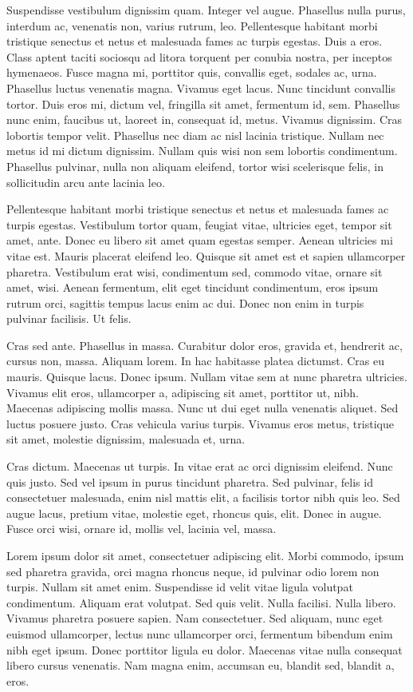 Suspendisse vestibulum dignissim quam. Integer vel augue. Phasellus nulla
purus, interdum ac, venenatis non, varius rutrum, leo. Pellentesque habitant
morbi tristique senectus et netus et malesuada fames ac turpis egestas. Duis a
eros. Class aptent taciti sociosqu ad litora torquent per conubia nostra, per
inceptos hymenaeos. Fusce magna mi, porttitor quis, convallis eget, sodales ac,
urna. Phasellus luctus venenatis magna. Vivamus eget lacus. Nunc tincidunt
convallis tortor. Duis eros mi, dictum vel, fringilla sit amet, fermentum id,
sem. Phasellus nunc enim, faucibus ut, laoreet in, consequat id, metus. Vivamus
dignissim. Cras lobortis tempor velit. Phasellus nec diam ac nisl lacinia
tristique. Nullam nec metus id mi dictum dignissim. Nullam quis wisi non sem
lobortis condimentum. Phasellus pulvinar, nulla non aliquam eleifend, tortor
wisi scelerisque felis, in sollicitudin arcu ante lacinia leo.

Pellentesque habitant morbi tristique senectus et netus et malesuada fames ac
turpis egestas. Vestibulum tortor quam, feugiat vitae, ultricies eget, tempor
sit amet, ante. Donec eu libero sit amet quam egestas semper. Aenean ultricies
mi vitae est. Mauris placerat eleifend leo. Quisque sit amet est et sapien
ullamcorper pharetra. Vestibulum erat wisi, condimentum sed, commodo vitae,
ornare sit amet, wisi. Aenean fermentum, elit eget tincidunt condimentum, eros
ipsum rutrum orci, sagittis tempus lacus enim ac dui. Donec non enim in turpis
pulvinar facilisis. Ut felis.

Cras sed ante. Phasellus in massa. Curabitur dolor eros, gravida et, hendrerit
ac, cursus non, massa. Aliquam lorem. In hac habitasse platea dictumst. Cras eu
mauris. Quisque lacus. Donec ipsum. Nullam vitae sem at nunc pharetra
ultricies. Vivamus elit eros, ullamcorper a, adipiscing sit amet, porttitor ut,
nibh. Maecenas adipiscing mollis massa. Nunc ut dui eget nulla venenatis
aliquet. Sed luctus posuere justo. Cras vehicula varius turpis. Vivamus eros
metus, tristique sit amet, molestie dignissim, malesuada et, urna.

Cras dictum. Maecenas ut turpis. In vitae erat ac orci dignissim eleifend. Nunc
quis justo. Sed vel ipsum in purus tincidunt pharetra. Sed pulvinar, felis id
consectetuer malesuada, enim nisl mattis elit, a facilisis tortor nibh quis
leo. Sed augue lacus, pretium vitae, molestie eget, rhoncus quis, elit. Donec
in augue. Fusce orci wisi, ornare id, mollis vel, lacinia vel, massa.

Lorem ipsum dolor sit amet, consectetuer adipiscing elit. Morbi commodo, ipsum
sed pharetra gravida, orci magna rhoncus neque, id pulvinar odio lorem non
turpis. Nullam sit amet enim. Suspendisse id velit vitae ligula volutpat
condimentum. Aliquam erat volutpat. Sed quis velit. Nulla facilisi. Nulla
libero. Vivamus pharetra posuere sapien. Nam consectetuer. Sed aliquam, nunc
eget euismod ullamcorper, lectus nunc ullamcorper orci, fermentum bibendum enim
nibh eget ipsum. Donec porttitor ligula eu dolor. Maecenas vitae nulla
consequat libero cursus venenatis. Nam magna enim, accumsan eu, blandit sed,
blandit a, eros.

